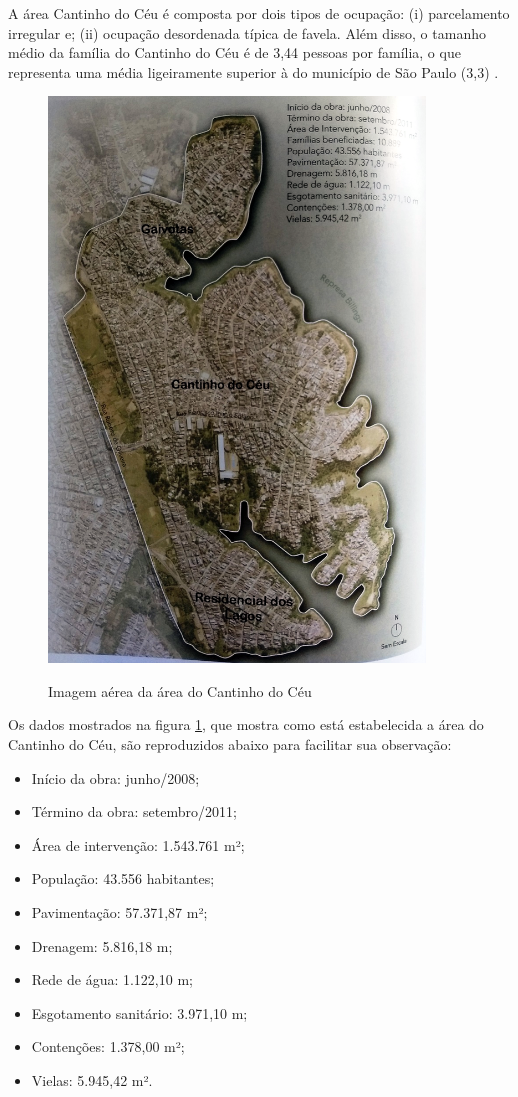 	A área Cantinho do Céu é composta por dois tipos de ocupação: (i) parcelamento irregular e; (ii) ocupação desordenada típica de favela. Além disso, o tamanho médio da família do Cantinho do Céu é de 3,44 pessoas por família, o que representa uma média ligeiramente superior à do município de São Paulo (3,3) \cite{Barda2012}.
	
	\begin{figure}[htb]
		\centering
		\caption{Imagem aérea da área do Cantinho do Céu}
		\includegraphics[height=15cm]{img/barda_peninsula}
		\label{fig:peninsula}
	\end{figure}
	
	Os dados mostrados na figura \ref{fig:peninsula}, que mostra como está estabelecida a área do Cantinho do Céu, são reproduzidos abaixo para facilitar sua observação:
	
	\begin{itemize}
	    \item Início da obra: junho/2008;
	    \item Término da obra: setembro/2011;
	    \item Área de intervenção: 1.543.761 m²;
	    \item População: 43.556 habitantes;
	    \item Pavimentação: 57.371,87 m²;
	    \item Drenagem: 5.816,18 m;
	    \item Rede de água: 1.122,10 m;
	    \item Esgotamento sanitário: 3.971,10 m;
	    \item Contenções: 1.378,00 m²;
	    \item Vielas: 5.945,42 m².
	\end{itemize}
	
